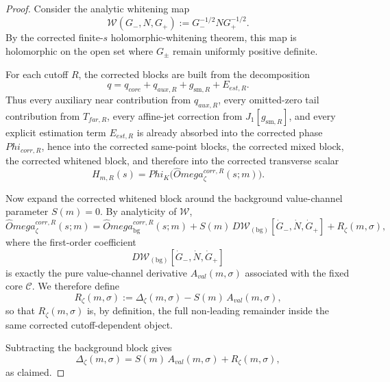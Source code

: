 \documentclass[11pt,a4paper]{amsart}
\def\Omega{Omega}%
\def\Phi{Phi}%
\def\corr{corr}%
\def\val{val}%
\def\far{far}%
\def\est{est}%
\def\core{core}%
\def\aux{aux}%
\theoremstyle{plain}
\theoremstyle{definition}
\newcommand{\sm}{\mathrm{sm}}
\newcommand{\far}{\mathrm{far}}
\newcommand{\est}{\mathrm{est}}
\newcommand{\val}{\mathrm{val}}
\newcommand{\corr}{\mathrm{corr}}
\newcommand{\bg}{\mathrm{bg}}
\newcommand{\core}{\mathrm{core}}
\newcommand{\aux}{\mathrm{aux}}
\begin{document}
\begin{proof}
Consider the analytic whitening map
\[
\mathcal W(G_-,N,G_+):=G_-^{-1/2}NG_+^{-1/2}.
\]
By the corrected finite-$s$ holomorphic-whitening theorem, this map is
holomorphic on the open set where $G_\pm$ remain uniformly positive definite.

For each cutoff $R$, the corrected blocks are built from the decomposition
\[
q=q_{\core}+q_{\aux,R}+g_{\sm,R}+E_{\est,R}.
\]
Thus every auxiliary near contribution from $q_{\aux,R}$, every omitted-zero
tail contribution from $T_{\far,R}$, every affine-jet correction from
$J_1[g_{\sm,R}]$, and every explicit estimation term $E_{\est,R}$ is already
absorbed into the corrected phase $\Phi_{\corr,R}$, hence into the corrected
same-point blocks, the corrected mixed block, the corrected whitened block,
and therefore into the corrected transverse scalar
\[
H_{m,R}(s)=\Phi_K\!\bigl(\widehat\Omega_\zeta^{\corr,R}(s;m)\bigr).
\]

Now expand the corrected whitened block around the background value-channel
parameter $S(m)=0$. By analyticity of $\mathcal W$,
\[
\widehat\Omega_\zeta^{\corr,R}(s;m)
=
\widehat\Omega_{\bg}^{\corr,R}(s;m)
+
S(m)\,D\mathcal W_{(\bg)}[\dot G_-,\dot N,\dot G_+]
+
R_\zeta(m,\sigma),
\]
where the first-order coefficient
\[
D\mathcal W_{(\bg)}[\dot G_-,\dot N,\dot G_+]
\]
is exactly the pure value-channel derivative $A_{\val}(m,\sigma)$ associated
with the fixed core $\mathcal C$. We therefore define
\[
R_\zeta(m,\sigma)
:=
\Delta_\zeta(m,\sigma)-S(m)\,A_{\val}(m,\sigma),
\]
so that $R_\zeta(m,\sigma)$ is, by definition, the full non-leading remainder
inside the same corrected cutoff-dependent object.

Subtracting the background block gives
\[
\Delta_\zeta(m,\sigma)
=
S(m)\,A_{\val}(m,\sigma)+R_\zeta(m,\sigma),
\]
as claimed.
\end{proof}
\end{document}
